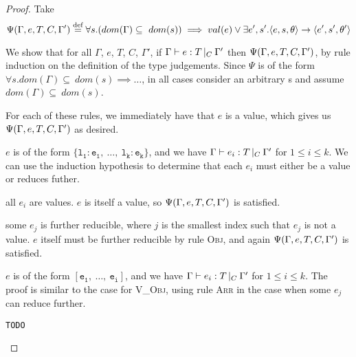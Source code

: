 \documentclass[a4paper]{article}
\theoremstyle{dotless}
\begin{document}
\begin{proof}\label{expProgressProof}
  Take $$ \Psi(\Gamma, e, T, C, \Gamma') \stackrel{\text{def}}{=} \\
  \forall s.  (dom(\Gamma) \subseteq\ dom(s)) \implies val(e) \vee
  \exists e', s'. \langle{}e,s,\theta\rangle{}\rightarrow{}\langle{}e',s',\theta'\rangle $$

  We show that for all $\Gamma$, $e$, $T$, $C$, $\Gamma'$, if
  $\Gamma{}\vdash e: T\,|_C\:\Gamma'$ then $\Psi(\Gamma, e, T, C, \Gamma')$, by rule induction on the definition of
  the type judgements. Since $\Psi$ is of the form $\forall s.dom(\Gamma) \subseteq\ dom(s)\implies\dots$, in all cases consider an arbitrary s
  and assume $dom(\Gamma) \subseteq\ dom(s)$.

  \begin{case}\label{values} 

	For each of these rules, we immediately have that $e$ is a value, which
	gives us $\Psi(\Gamma, e, T, C, \Gamma'){}$ as desired.

  \end{case}

  \begin{case}[V\_Obj]\label{v_obj}

	$e$ is of the form $\mathtt{\{l_1: e_1,\ \dots,\ l_k: e_k\}}$, and we have $\Gamma{}\vdash e_i: T\,|_C\:\Gamma'$ for $1 \leq i \leq k$.
	We can use the induction hypothesis to determine that each $e_i$ must
	either be a value or reduces futher.
	\begin{subcase}
	  all $e_i$ are values. $e$ is itself a value, so $\Psi(\Gamma, e, T, C, \Gamma')$ is
	  satisfied.
  	\end{subcase}
  	\begin{subcase}
  	  some $e_j$ is further reducible, where $j$ is the smallest index such
  	  that $e_j$ is not a value. $e$ itself must be further reducible by
  	  rule \textsc{Obj}, and again $\Psi(\Gamma, e, T, C, \Gamma')$ is satisfied.
	\end{subcase}
  \end{case}

  \begin{case}[V\_Arr]\label{v_arr}

	$e$ is of the form $\mathtt{[e_1,\ \dots,\ e_i]}$, and we have $\Gamma{}\vdash e_i: T\,|_C\:\Gamma'$ for $1 \leq i \leq k$.
	The proof is similar to the case for \textsc{V\_Obj}, using rule
	\textsc{Arr} in the case when some $e_j$ can reduce further.

  \end{case}

  \begin{case}[Fun1]\label{fun1}
	\texttt{TODO}
  \end{case}


\end{proof}
\end{document}
